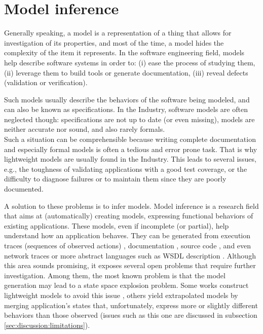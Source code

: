 \section{Model inference}
\label{sec:related:modelinf}

Generally speaking, a model is a representation of a thing that
allows for investigation of its properties, and most of the time,
a model hides the complexity of the item it represents. In the
software engineering field, models help describe software systems
in order to: (i) ease the process of studying them, (ii) leverage
them to build tools or generate documentation, (iii) reveal
defects (validation or verification).

Such models usually describe the behaviors of the software being
modeled, and can also be known as specifications. In the
Industry, software models are often neglected though:
specifications are not up to date (or even missing), models are
neither accurate nor sound, and also rarely formals.\\
Such a situation can be comprehensible because writing complete
documentation and especially formal models is often a tedious and
error prone task. That is why lightweight models are usually
found in the Industry. This leads to several issues, e.g., the
toughness of validating applications with a good test coverage,
or the difficulty to diagnose failures or to maintain them since
they are poorly documented.

A solution to these problems is to infer models. Model
inference is a research field that aims at (automatically)
creating models, expressing functional behaviors of existing
applications.  These models, even if incomplete (or partial),
help understand how an application behaves. They can be generated
from execution traces (sequences of observed actions)
\cite{Krka:2010:UDE:1810295.1810324}, documentation
\cite{ZhongZXM11}, source code
\cite{Salah05scenariographer,Pradel:2009}, and even network
traces \cite{6079839} or more abstract languages such as WSDL
description \cite{Bertolino:2009:ASB:1595696.1595719}. Although
this area sounds promising, it exposes several open problems that
require further investigation. Among them, the most known problem
is that the model generation may lead to a state space explosion
problem. Some works construct lightweight models to avoid this
issue \cite{WPX13}, others yield extrapolated models by merging
application's states that, unfortunately, express more or
slightly different behaviors than those observed \cite{4023976}
(issues such as this one are discussed in subsection
\ref{sec:discussion:limitations}).

